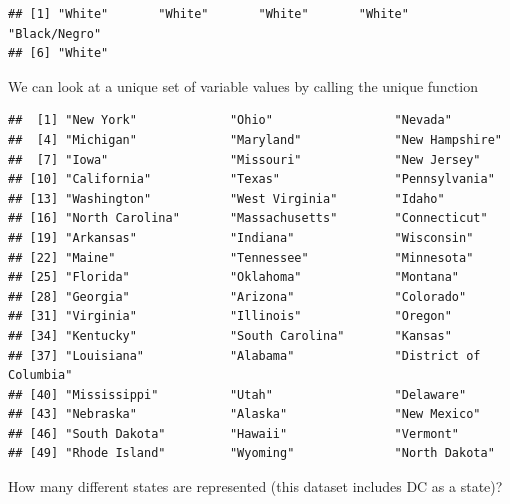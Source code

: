 \documentclass[
]{book}
\newenvironment{Shaded}{\begin{snugshade}}{\end{snugshade}}
\newcommand{\KeywordTok}[1]{\textcolor[rgb]{0.13,0.29,0.53}{\textbf{#1}}}
\newcommand{\NormalTok}[1]{#1}
\newcommand{\OperatorTok}[1]{\textcolor[rgb]{0.81,0.36,0.00}{\textbf{#1}}}
\theoremstyle{definition}
\theoremstyle{definition}
\theoremstyle{definition}
\theoremstyle{remark}
\begin{document}
\begin{verbatim}
## [1] "White"       "White"       "White"       "White"       "Black/Negro"
## [6] "White"
\end{verbatim}

We can look at a unique set of variable values by calling the unique function

\begin{Shaded}
\end{Shaded}

\begin{verbatim}
##  [1] "New York"             "Ohio"                 "Nevada"              
##  [4] "Michigan"             "Maryland"             "New Hampshire"       
##  [7] "Iowa"                 "Missouri"             "New Jersey"          
## [10] "California"           "Texas"                "Pennsylvania"        
## [13] "Washington"           "West Virginia"        "Idaho"               
## [16] "North Carolina"       "Massachusetts"        "Connecticut"         
## [19] "Arkansas"             "Indiana"              "Wisconsin"           
## [22] "Maine"                "Tennessee"            "Minnesota"           
## [25] "Florida"              "Oklahoma"             "Montana"             
## [28] "Georgia"              "Arizona"              "Colorado"            
## [31] "Virginia"             "Illinois"             "Oregon"              
## [34] "Kentucky"             "South Carolina"       "Kansas"              
## [37] "Louisiana"            "Alabama"              "District of Columbia"
## [40] "Mississippi"          "Utah"                 "Delaware"            
## [43] "Nebraska"             "Alaska"               "New Mexico"          
## [46] "South Dakota"         "Hawaii"               "Vermont"             
## [49] "Rhode Island"         "Wyoming"              "North Dakota"
\end{verbatim}

How many different states are represented (this dataset includes DC as a state)?

\begin{Shaded}
\end{Shaded}
\end{document}
